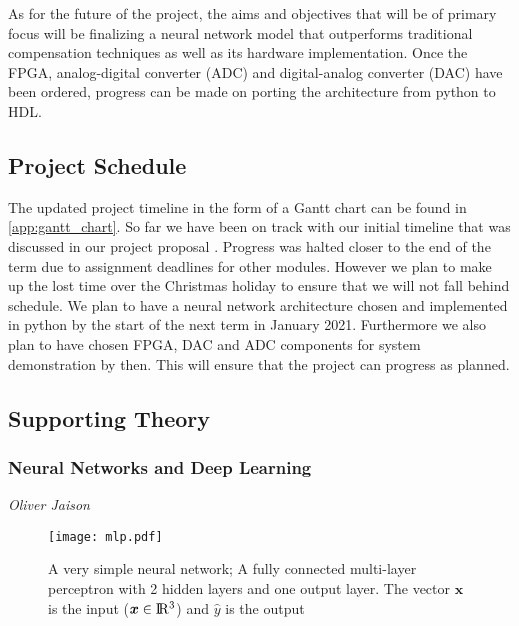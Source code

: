     As for the future of the project, the aims and objectives that will be of primary focus will be finalizing a neural network model that outperforms traditional compensation techniques as well as its hardware implementation. Once the FPGA, analog-digital converter (ADC) and digital-analog converter (DAC) have been ordered, progress can be made on porting the architecture from python to HDL.

\clearpage

\subsection{Project Schedule}

    The updated project timeline in the form of a Gantt chart can be found in \autoref{app:gantt_chart}. So far we have been on track with our initial timeline that was discussed in our project proposal \autocite{proposal_report}. Progress was halted closer to the end of the term due to assignment deadlines for other modules. However we plan to make up the lost time over the Christmas holiday to ensure that we will not fall behind schedule. We plan to have a neural network architecture chosen and implemented in python by the start of the next term in January 2021. Furthermore we also plan to have chosen FPGA, DAC and ADC components for system demonstration by then. This will ensure that the project can progress as planned.

\subsection{Supporting Theory}

    \subsubsection{Neural Networks and Deep Learning}
    \label{sec:neural_network_theory}
    \hspace*{0pt}\hfill \textit{Oliver Jaison}\\
        
        \begin{figure}[H]
            \centering
            \texttt{[image: mlp.pdf]}
            \caption{A very simple neural network; A fully connected multi-layer perceptron with 2 hidden layers and one output layer. The vector $\boldsymbol{x}$ is the input ($\boldsymbol{x} \in \rm I\!R^{3}$) and $\hat{y}$ is the output}
            \label{fig:simple_neural_network}
        \end{figure}
        

